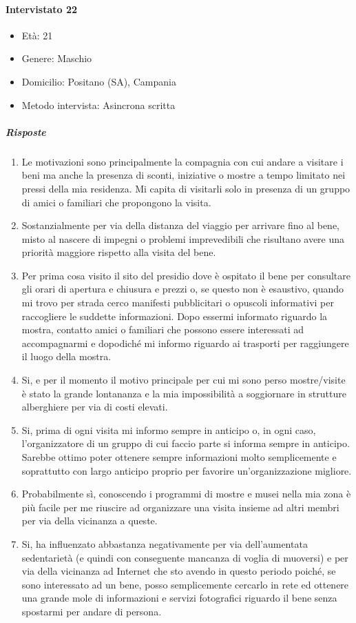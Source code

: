 \documentclass{article}
\begin{document}
\paragraph{Intervistato 22}
\begin{itemize}
\item Età: 21
\item Genere: Maschio
\item Domicilio: Positano (SA), Campania
\item Metodo intervista: Asincrona scritta
\end{itemize}
\subparagraph{Risposte}
\begin{enumerate}
\item Le motivazioni sono principalmente la compagnia con cui andare a visitare i beni ma anche la presenza di sconti, iniziative o mostre a tempo limitato nei pressi della mia residenza. Mi capita di visitarli solo in presenza di un gruppo di amici o familiari che propongono la visita.
\item Sostanzialmente per via della distanza del viaggio per arrivare fino al bene, misto al nascere di impegni o problemi imprevedibili che risultano avere una priorità maggiore rispetto alla visita del bene.
\item Per prima cosa visito il sito del presidio dove è ospitato il bene per consultare gli orari di apertura e chiusura e prezzi o, se questo non è esaustivo, quando mi trovo per strada cerco manifesti pubblicitari o opuscoli informativi per raccogliere le suddette informazioni. Dopo essermi informato riguardo la mostra, contatto amici o familiari che possono essere interessati ad accompagnarmi e dopodiché mi informo riguardo ai trasporti per raggiungere il luogo della mostra.
\item Si, e per il momento il motivo principale per cui mi sono perso mostre/visite è stato la grande lontananza e la mia impossibilità a soggiornare in strutture alberghiere per via di costi elevati.
\item Si, prima di ogni visita mi informo sempre in anticipo o, in ogni caso, l'organizzatore di un gruppo di cui faccio parte si informa sempre in anticipo. Sarebbe ottimo poter ottenere sempre informazioni molto semplicemente e soprattutto con largo anticipo proprio per favorire un'organizzazione migliore.
\item Probabilmente sì, conoscendo i programmi di mostre e musei nella mia zona è più facile per me riuscire ad organizzare una visita insieme ad altri membri per via della vicinanza a queste.
\item Si, ha influenzato abbastanza negativamente per via dell'aumentata sedentarietà (e quindi con conseguente mancanza di voglia di muoversi) e per via della vicinanza ad Internet che sto avendo in questo periodo poiché, se sono interessato ad un bene, posso semplicemente cercarlo in rete ed ottenere una grande mole di informazioni e servizi fotografici riguardo il bene senza spostarmi per andare di persona.

\end{enumerate}
\end{document}
